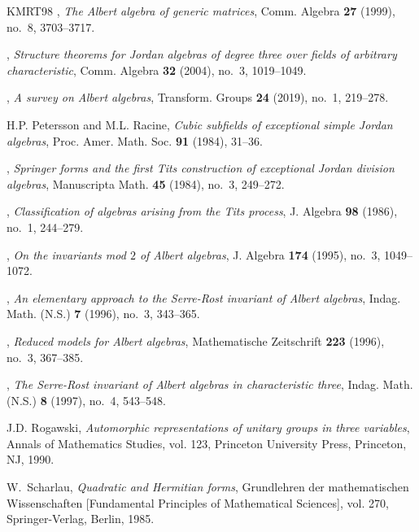 \documentclass{amsart}
\theoremstyle{definition} %
\theoremstyle{remark} %
\renewcommand{\:}{\colon\,}
\numberwithin{equation}{section}
\begin{document}
\begin{thebibliography}{KMRT98}
\bysame, \emph{The {A}lbert algebra of generic matrices}, Comm. Algebra \textbf{27} (1999), no.~8, 3703--3717. 

\bysame, \emph{Structure theorems for {J}ordan algebras of degree three over fields of arbitrary characteristic}, Comm. Algebra \textbf{32} (2004), no.~3, 1019--1049. 

\bysame, \emph{A survey on {A}lbert algebras}, Transform. Groups \textbf{24} (2019), no.~1, 219--278. 

H.P. Petersson and M.L. Racine, \emph{Cubic subfields of exceptional simple {J}ordan algebras}, Proc. Amer. Math. Soc. \textbf{91} (1984), 31--36. 

\bysame, \emph{Springer forms and the first {T}its construction of exceptional {J}ordan division algebras}, Manuscripta Math. \textbf{45} (1984), no.~3, 249--272. 

\bysame, \emph{Classification of algebras arising from the {T}its process}, J. Algebra \textbf{98} (1986), no.~1, 244--279. 

\bysame, \emph{On the invariants mod {$2$} of {A}lbert algebras}, J. Algebra \textbf{174} (1995), no.~3, 1049--1072. 

\bysame, \emph{An elementary approach to the {S}erre-{R}ost invariant of {A}lbert algebras}, Indag. Math. (N.S.) \textbf{7} (1996), no.~3, 343--365. 

\bysame, \emph{Reduced models for {A}lbert algebras}, Mathematische Zeitschrift \textbf{223} (1996), no.~3, 367--385. 

\bysame, \emph{The {S}erre-{R}ost invariant of {A}lbert algebras in characteristic three}, Indag. Math. (N.S.) \textbf{8} (1997), no.~4, 543--548.

J.D. Rogawski, \emph{Automorphic representations of unitary groups in three variables}, Annals of Mathematics Studies, vol. 123, Princeton University Press, Princeton, NJ, 1990. 

W.~Scharlau, \emph{Quadratic and {H}ermitian forms}, Grundlehren der mathematischen Wissenschaften [Fundamental Principles of Mathematical Sciences], vol. 270, Springer-Verlag, Berlin, 1985. 


\end{thebibliography}
\end{document}
